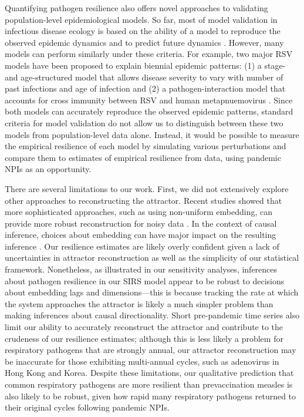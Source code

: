 \documentclass[12pt]{article}
\begin{document}
Quantifying pathogen resilience also offers novel approaches to validating population-level epidemiological models.
So far, most of model validation in infectious disease ecology is based on the ability of a model to reproduce the observed epidemic dynamics and to predict future dynamics \citep{grenfell2002dynamics,bhattacharyya2015cross,pitzer2015environmental,dean2018human,pons2018serotype}.
However, many models can perform similarly under these criteria.
For example, two major RSV models have been proposed to explain biennial epidemic patterns: (1) a stage- and age-structured model that allows disease severity to vary with number of past infections and age of infection \citep{pitzer2015environmental} and (2) a pathogen-interaction model that accounts for cross immunity between RSV and human metapnuemovirus \citep{bhattacharyya2015cross}.
Since both models can accurately reproduce the observed epidemic patterns, standard criteria for model validation do not allow us to distinguish between these two models from population-level data alone.
Instead, it would be possible to measure the empirical resilience of each model by simulating various perturbations and compare them to estimates of empirical resilience from data, using pandemic NPIs as an opportunity.

There are several limitations to our work.
First, we did not extensively explore other approaches to reconstructing the attractor.
Recent studies showed that more sophisticated approaches, such as using non-uniform embedding, can provide more robust reconstruction for noisy data \citep{tan2023selecting}.
In the context of causal inference, choices about embedding can have major impact on the resulting inference \citep{cobey2016limits}.
Our resilience estimates are likely overly confident given a lack of uncertainties in attractor reconstruction as well as the simplicity of our statistical framework.
Nonetheless, as illustrated in our sensitivity analyses, inferences about pathogen resilience in our SIRS model appear to be robust to decisions about embedding lags and dimensions---this is because tracking the rate at which the system approaches the attractor is likely a much simpler problem than making inferences about causal directionality.
Short pre-pandemic time series also limit our ability to accurately reconstruct the attractor and contribute to the crudeness of our resilience estimates;
although this is less likely a problem for respiratory pathogens that are strongly annual, our attractor reconstruction may be inaccurate for those exhibiting multi-annual cycles, such as adenovirus in Hong Kong and Korea.
Despite these limitations, our qualitative prediction that common respiratory pathogens are more resilient than prevaccination measles is also likely to be robust, given how rapid many respiratory pathogens returned to their original cycles following pandemic NPIs.
\end{document}
